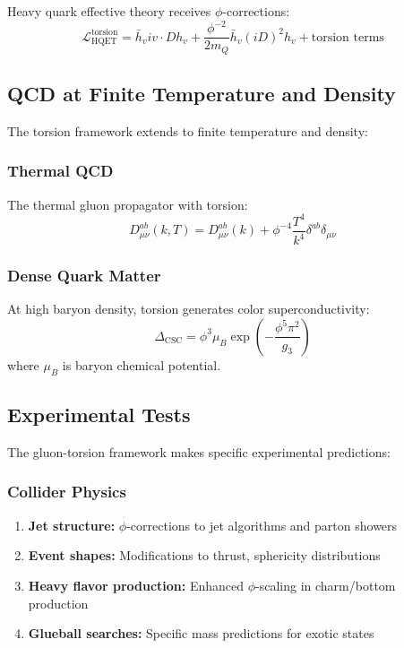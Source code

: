 Heavy quark effective theory receives $\phi$-corrections:
\begin{equation}
\mathcal{L}_{\text{HQET}}^{\text{torsion}} = \bar{h}_v i v \cdot D h_v + \frac{\phi^{-2}}{2m_Q} \bar{h}_v (iD)^2 h_v + \text{torsion terms}
\end{equation}

\subsection{QCD at Finite Temperature and Density}

The torsion framework extends to finite temperature and density:

\subsubsection{Thermal QCD}

The thermal gluon propagator with torsion:
\begin{equation}
D_{\mu\nu}^{ab}(k, T) = D_{\mu\nu}^{ab}(k) + \phi^{-4} \frac{T^4}{k^4} \delta^{ab} \delta_{\mu\nu}
\end{equation}

\subsubsection{Dense Quark Matter}

At high baryon density, torsion generates color superconductivity:
\begin{equation}
\Delta_{\text{CSC}} = \phi^3 \mu_B \exp\left(-\frac{\phi^5 \pi^2}{g_3}\right)
\end{equation}
where $\mu_B$ is baryon chemical potential.

\subsection{Experimental Tests}

The gluon-torsion framework makes specific experimental predictions:

\subsubsection{Collider Physics}

\begin{enumerate}
\item \textbf{Jet structure:} $\phi$-corrections to jet algorithms and parton showers
\item \textbf{Event shapes:} Modifications to thrust, sphericity distributions
\item \textbf{Heavy flavor production:} Enhanced $\phi$-scaling in charm/bottom production
\item \textbf{Glueball searches:} Specific mass predictions for exotic states
\end{enumerate}

